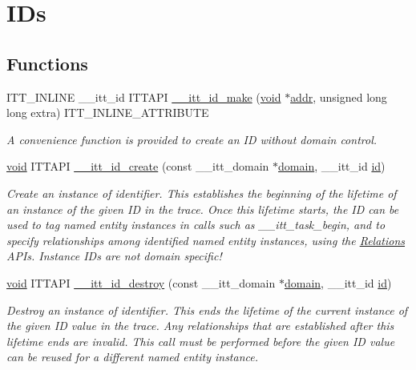 \hypertarget{group__ids}{\section{I\-Ds}
\label{group__ids}
}
\subsection*{Functions}
\begin{DoxyCompactItemize}
\item 
I\-T\-T\-\_\-\-I\-N\-L\-I\-N\-E \-\_\-\-\_\-itt\-\_\-id I\-T\-T\-A\-P\-I \hyperlink{group__ids_ga3a34add1c1ff5133f68e87a6f21ce8cb}{\-\_\-\-\_\-itt\-\_\-id\-\_\-make} (\hyperlink{ittnotify__static_8h_af941d56e55e3c5465135b60c4d6343ed}{void} $\ast$\hyperlink{ittnotify__static_8h_a7e21c61c16fffcc27199a9d66ff39ab8}{addr}, unsigned long long extra) I\-T\-T\-\_\-\-I\-N\-L\-I\-N\-E\-\_\-\-A\-T\-T\-R\-I\-B\-U\-T\-E
\begin{DoxyCompactList}\small\item\em A convenience function is provided to create an I\-D without domain control. \end{DoxyCompactList}\item 
\hyperlink{ittnotify__static_8h_af941d56e55e3c5465135b60c4d6343ed}{void} I\-T\-T\-A\-P\-I \hyperlink{group__ids_ga935dd3611e942563fb60db1ccee453c7}{\-\_\-\-\_\-itt\-\_\-id\-\_\-create} (const \-\_\-\-\_\-itt\-\_\-domain $\ast$\hyperlink{ittnotify__static_8h_ae4bc3459cfd348603d57d87ede15591b}{domain}, \-\_\-\-\_\-itt\-\_\-id \hyperlink{ittnotify__static_8h_a9ebeaf6e841ab2e3ed2f92a8850e0c3d}{id})
\begin{DoxyCompactList}\small\item\em Create an instance of identifier. This establishes the beginning of the lifetime of an instance of the given I\-D in the trace. Once this lifetime starts, the I\-D can be used to tag named entity instances in calls such as \-\_\-\-\_\-itt\-\_\-task\-\_\-begin, and to specify relationships among identified named entity instances, using the \hyperlink{group__relations}{Relations} A\-P\-Is. Instance I\-Ds are not domain specific! \end{DoxyCompactList}\item 
\hyperlink{ittnotify__static_8h_af941d56e55e3c5465135b60c4d6343ed}{void} I\-T\-T\-A\-P\-I \hyperlink{group__ids_ga9b1b0ac6c1084ae77b22708886f468a5}{\-\_\-\-\_\-itt\-\_\-id\-\_\-destroy} (const \-\_\-\-\_\-itt\-\_\-domain $\ast$\hyperlink{ittnotify__static_8h_ae4bc3459cfd348603d57d87ede15591b}{domain}, \-\_\-\-\_\-itt\-\_\-id \hyperlink{ittnotify__static_8h_a9ebeaf6e841ab2e3ed2f92a8850e0c3d}{id})
\begin{DoxyCompactList}\small\item\em Destroy an instance of identifier. This ends the lifetime of the current instance of the given I\-D value in the trace. Any relationships that are established after this lifetime ends are invalid. This call must be performed before the given I\-D value can be reused for a different named entity instance. \end{DoxyCompactList}\end{DoxyCompactItemize}
